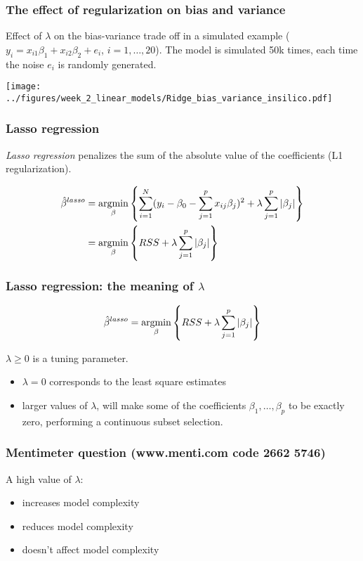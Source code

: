 \documentclass[notes]{beamer}          %
\newcommand{\argmin}{\operatornamewithlimits{argmin}}
\begin{document}
\begin{frame}
\frametitle{The effect of regularization on bias and variance}
Effect of $\lambda$ on the bias-variance trade off in a simulated example ($y_i = x_{i1}\beta_1 + x_{i2}\beta_2 + e_i$, $i=1,\dots, 20$). The model is simulated 50k times, each time the noise $e_i$ is randomly generated.




\begin{center}
\texttt{[image: ../figures/week\_2\_linear\_models/Ridge\_bias\_variance\_insilico.pdf]}
\end{center}

\end{frame}


\begin{frame}
\frametitle{Lasso regression}
\textit{Lasso regression} penalizes the sum of the absolute value of the coefficients (L1 regularization). 

\begin{align*}
\hat{\beta}^{lasso} &= \argmin_{\beta} \left\{ \sum_{i=1}^N (y_i - \beta_0 -  \sum_{j=1}^p x_{ij}\beta_j)^2 + \lambda \sum_{j=1}^p | \beta_j | \right\} \\
& =  \argmin_{\beta} \left\{ RSS + \lambda \sum_{j=1}^p | \beta_j | \right\}
\end{align*}

\end{frame}


\begin{frame}
\frametitle{Lasso regression: the meaning of $\lambda$}

\begin{equation*}
    \hat{\beta}^{lasso} =  \argmin_{\beta} \left\{ RSS + \lambda \sum_{j=1}^p | \beta_j | \right\}
\end{equation*}

$\lambda \geq 0$ is a tuning parameter.

\begin{itemize}
    \item $\lambda = 0$ corresponds to the least square estimates
    \item larger values of $\lambda$, will make some of the coefficients $\beta_1, \dots, \beta_p$ to be exactly zero, performing a continuous subset selection.
\end{itemize}
\end{frame}

\begin{frame}
\frametitle{Mentimeter question (www.menti.com code 2662 5746)}

A high value of $\lambda$:
\begin{itemize}
    \item increases model complexity
    \item reduces model complexity
    \item doesn't affect model complexity
\end{itemize}
\end{frame}
\end{document}
